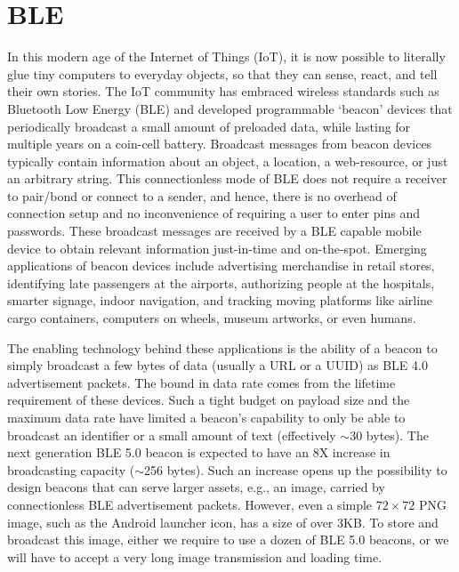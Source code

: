 \chapter{BLE}


In this modern age of the Internet of Things (IoT), it is now possible to literally glue tiny computers to everyday objects, so that they can sense, react, and tell their own stories. The IoT community has embraced wireless standards such as Bluetooth Low Energy (BLE) and developed programmable `beacon' devices that periodically broadcast a small amount of preloaded data, while lasting for multiple years on a coin-cell battery. Broadcast messages from beacon devices typically contain information about an object, a location, a web-resource, or just an arbitrary string. This connectionless mode of BLE does not require a receiver to pair/bond or connect to a sender, and hence, there is no overhead of connection setup and no inconvenience of requiring a user to enter pins and passwords. These broadcast messages are received by a BLE capable mobile device to obtain relevant information just-in-time and on-the-spot.  Emerging applications of beacon devices include advertising merchandise in retail stores, identifying late passengers at the airports, authorizing people at the hospitals, smarter signage, indoor navigation, and tracking moving platforms like airline cargo containers, computers on wheels, museum artworks, or even humans.


The enabling technology behind these applications is the ability of a beacon to simply broadcast a few bytes of data (usually a URL or a UUID) as BLE 4.0 advertisement packets. The bound in data rate comes from the lifetime requirement of these devices. Such a tight budget on payload size and the maximum data rate have limited a beacon's capability to only be able to broadcast an identifier or a small amount of text (effectively $\sim$30 bytes). The next generation BLE 5.0 beacon is expected to have an 8X increase in broadcasting capacity ($\sim$256 bytes). Such an increase opens up the possibility to design beacons that can serve larger assets, e.g., an image, carried by connectionless BLE advertisement packets. However, even a simple $72\times 72$ PNG image, such as the Android launcher icon, has a size of over 3KB. To store and broadcast this image, either we require to use a dozen of BLE 5.0 beacons, or we will have to accept a very long image transmission and loading time.

